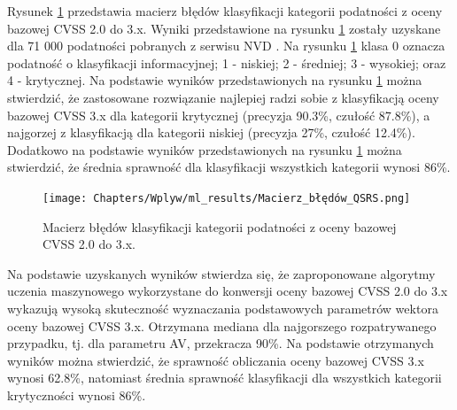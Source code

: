 \bigbreak
Rysunek \ref{fig:wplyw:ml:qsrs_base_score} przedstawia macierz błędów klasyfikacji kategorii podatności z oceny bazowej CVSS 2.0 do 3.x. Wyniki przedstawione na rysunku \ref{fig:wplyw:ml:qsrs_base_score} zostały uzyskane dla 71 000 podatności pobranych z serwisu NVD \cite{booth2013national}. Na rysunku \ref{fig:wplyw:ml:qsrs_base_score} klasa 0 oznacza podatność o klasyfikacji informacyjnej; 1 - niskiej; 2 - średniej; 3 - wysokiej; oraz 4 - krytycznej. Na podstawie wyników przedstawionych na rysunku \ref{fig:wplyw:ml:qsrs_base_score} można stwierdzić, że zastosowane rozwiązanie najlepiej radzi sobie z klasyfikacją oceny bazowej CVSS 3.x dla kategorii krytycznej (precyzja 90.3\%, czułość 87.8\%), a najgorzej z klasyfikacją dla kategorii niskiej (precyzja 27\%, czułość 12.4\%). Dodatkowo na podstawie wyników przedstawionych na rysunku \ref{fig:wplyw:ml:qsrs_base_score} można stwierdzić, że średnia sprawność dla klasyfikacji wszystkich kategorii wynosi 86\%.

\begin{figure}[!ht]
\centering
\texttt{[image: Chapters/Wplyw/ml\_results/Macierz\_błędów\_QSRS.png]}
\caption{Macierz błędów klasyfikacji kategorii podatności z oceny bazowej CVSS 2.0 do 3.x.}
\label{fig:wplyw:ml:qsrs_base_score}
\end{figure}

\bigbreak
Na podstawie uzyskanych wyników stwierdza się, że zaproponowane algorytmy uczenia maszynowego wykorzystane do konwersji oceny bazowej CVSS 2.0 do 3.x wykazują wysoką skuteczność wyznaczania podstawowych parametrów wektora oceny bazowej CVSS 3.x. Otrzymana mediana dla najgorszego rozpatrywanego przypadku, tj. dla parametru AV, przekracza 90\%. Na podstawie otrzymanych wyników można stwierdzić, że sprawność obliczania oceny bazowej CVSS 3.x wynosi 62.8\%, natomiast średnia sprawność klasyfikacji dla wszystkich kategorii krytyczności wynosi 86\%.
